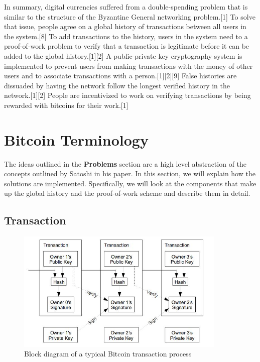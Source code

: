 \documentclass[pdftex,11pt]{article}
\begin{document}
In summary, digital currencies suffered from a double-spending problem that is similar to the structure of the Byzantine General networking problem.[1] To solve that issue, people agree on a global history of transactions between all users in the system.[8] To add transactions to the history, users in the system need to a proof-of-work problem to verify that a transaction is legitimate before it can be added to the global history.[1][2] A public-private key cryptography system is implemented to prevent users from making transactions with the money of other users and to associate transactions with a person.[1][2][9] False histories are dissuaded by having the network follow the longest verified history in the network.[1][2] People are incentivized to work on verifying transactions by being rewarded with bitcoins for their work.[1]

\section{Bitcoin Terminology}
The ideas outlined in the {\bf Problems} section are a high level abstraction of the concepts outlined by Satoshi in his paper. In this section, we will explain how the solutions are implemented. Specifically, we will look at the components that make up the global history and the proof-of-work scheme and describe them in detail.

\subsection{Transaction}

\begin{figure}[H]
	\centering
	\includegraphics[width=100mm]{figures/transaction.jpg}
	\caption{Block diagram of a typical Bitcoin transaction process}
	\label{transaction}
\end{figure}
\end{document}
